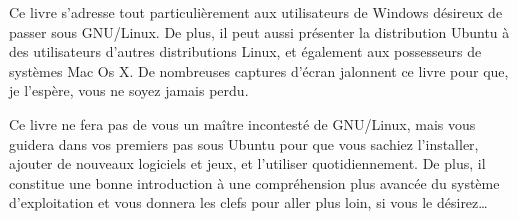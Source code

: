 
Ce livre s'adresse tout particulièrement aux utilisateurs de Windows désireux de passer sous GNU/Linux. De plus, il peut aussi présenter la distribution Ubuntu à des utilisateurs d'autres distributions Linux, et également aux possesseurs de systèmes Mac Os X. De nombreuses captures d'écran jalonnent ce livre pour que, je l'espère, vous ne soyez jamais perdu.\par
Ce livre ne fera pas de vous un maître incontesté de GNU/Linux, mais vous guidera dans vos premiers pas sous Ubuntu pour que vous sachiez l'installer, ajouter de nouveaux logiciels et jeux, et l'utiliser quotidiennement. De plus, il constitue une bonne introduction à une compréhension plus avancée du système d'exploitation et vous donnera les clefs pour aller plus loin, si vous le désirez\ldots{}\par
